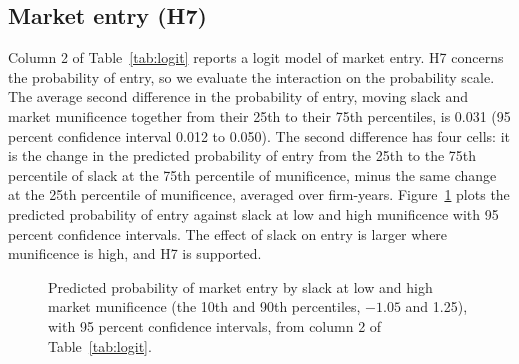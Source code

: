 \documentclass[11pt]{article}
\begin{document}
\clearpage
\subsection{Market entry (H7)}

Column 2 of Table~\ref{tab:logit} reports a logit model of market entry. H7 concerns the probability of entry, so we evaluate the interaction on the probability scale. The average second difference in the probability of entry, moving slack and market munificence together from their 25th to their 75th percentiles, is 0.031 (95 percent confidence interval 0.012 to 0.050). The second difference has four cells: it is the change in the predicted probability of entry from the 25th to the 75th percentile of slack at the 75th percentile of munificence, minus the same change at the 25th percentile of munificence, averaged over firm-years. Figure~\ref{fig:entry} plots the predicted probability of entry against slack at low and high munificence with 95 percent confidence intervals. The effect of slack on entry is larger where munificence is high, and H7 is supported.

\begin{figure}[H]
\centering
{}
\caption{Predicted probability of market entry by slack at low and high market munificence (the 10th and 90th percentiles, $-1.05$ and 1.25), with 95 percent confidence intervals, from column 2 of Table~\ref{tab:logit}.}\label{fig:entry}
\end{figure}
\end{document}
